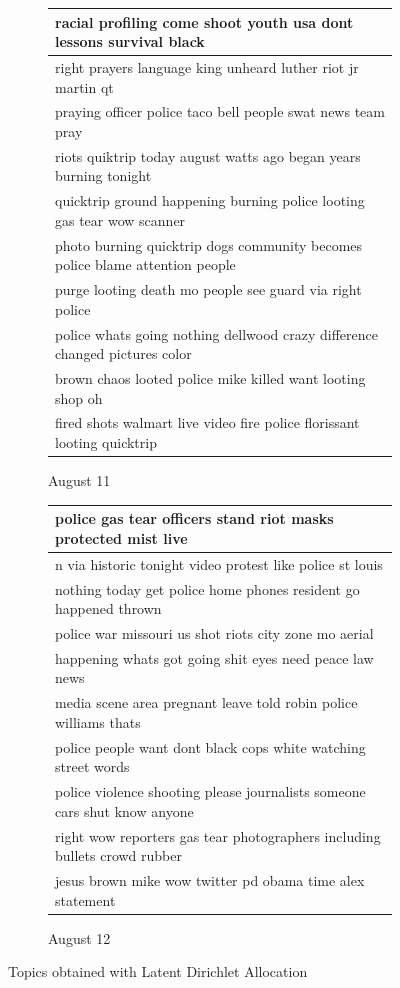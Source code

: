\documentclass[a4paper,twoside,12pt,openright]{report}
\begin{document}
\begin{figure}[H]
\begin{subfigure}[t]{\textwidth}
  \centering
\begin{tabularx}{0.9\textwidth}{l}
\hline
racial profiling come shoot youth usa dont lessons survival black \\ \hline
right prayers language king unheard luther riot jr martin qt \\ \hline
praying officer police taco bell people swat news team pray \\ \hline
riots quiktrip today august watts ago began years burning tonight \\ \hline
quicktrip ground happening burning police looting gas tear wow scanner \\ \hline
photo burning quicktrip dogs community becomes police blame attention people \\ \hline
purge looting death mo people see guard via right police \\ \hline
police whats going nothing dellwood crazy difference changed pictures color \\ \hline
brown chaos looted police mike killed want looting shop oh \\ \hline
fired shots walmart live video fire police florissant looting quicktrip \\ \hline
\end{tabularx}
\caption{August 11}
\label{topicLDA11}
\end{subfigure}
\begin{subfigure}[t]{\textwidth}
\vspace*{30pt}
  \centering
\begin{tabularx}{0.9\textwidth}{l}
\hline
police gas tear officers stand riot masks protected mist live \\ \hline
n via historic tonight video protest like police st louis \\ \hline
nothing today get police home phones resident go happened thrown \\ \hline
police war missouri us shot riots city zone mo aerial \\ \hline
happening whats got going shit eyes need peace law news \\ \hline
media scene area pregnant leave told robin police williams thats \\ \hline
police people want dont black cops white watching street words \\ \hline
police violence shooting please journalists someone cars shut know anyone \\ \hline
right wow reporters gas tear photographers including bullets crowd rubber \\ \hline
jesus brown mike wow twitter pd obama time alex statement \\ \hline
\end{tabularx}
\caption{August 12}
\label{topicLDA12}
\end{subfigure}
\caption{Topics obtained with Latent Dirichlet Allocation}
\end{figure}
\end{document}
